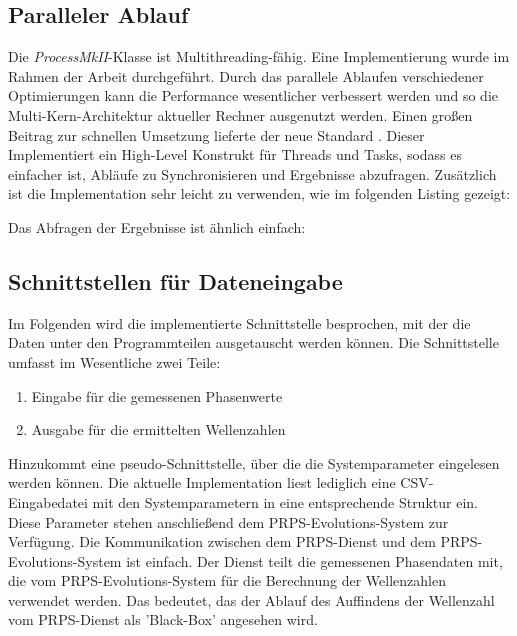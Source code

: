 \subsection{Paralleler Ablauf}
\label{parallel_computing}
%
Die \textit{ProcessMkII}-Klasse ist Multithreading-fähig. Eine Implementierung wurde im Rahmen der Arbeit durchgeführt. Durch das parallele Ablaufen verschiedener Optimierungen kann die Performance wesentlicher verbessert werden und so die Multi-Kern-Architektur aktueller Rechner ausgenutzt werden. Einen großen Beitrag zur schnellen Umsetzung lieferte der neue Standard . Dieser Implementiert ein High-Level Konstrukt für Threads und Tasks, sodass es einfacher ist, Abläufe zu Synchronisieren und Ergebnisse abzufragen. Zusätzlich ist die Implementation sehr leicht zu verwenden, wie im folgenden Listing gezeigt:
%

				 \label{lst:Parallel_example1.cpp}
%
\vspace{2mm}
Das Abfragen der Ergebnisse ist ähnlich einfach:
\vspace{2mm}
%

				 \label{lst:Parallel_example2.cpp}
%
\vspace{2mm}
%
\subsection{Schnittstellen für Dateneingabe}
%
Im Folgenden wird die implementierte Schnittstelle besprochen, mit der die Daten unter den Programmteilen ausgetauscht werden können. Die Schnittstelle umfasst im Wesentliche zwei Teile:
\begin{enumerate}
	\item Eingabe für die gemessenen Phasenwerte
	\item Ausgabe für die ermittelten Wellenzahlen
\end{enumerate}
%
Hinzukommt eine pseudo-Schnittstelle, über die die Systemparameter eingelesen werden können. Die aktuelle Implementation liest lediglich eine CSV-Eingabedatei mit den Systemparametern in eine entsprechende Struktur ein. Diese Parameter stehen anschließend dem PRPS-Evolutions-System zur Verfügung.
%
Die Kommunikation zwischen dem PRPS-Dienst und dem PRPS-Evolutions-System ist einfach. Der Dienst teilt die gemessenen Phasendaten mit, die vom PRPS-Evolutions-System für die Berechnung der Wellenzahlen verwendet werden. Das bedeutet, das der Ablauf des Auffindens der Wellenzahl vom PRPS-Dienst als 'Black-Box' angesehen wird.\\
%
